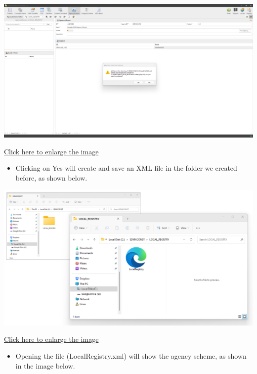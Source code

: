 \documentclass[
]{book}
\providecommand{\tightlist}{%
  \setlength{\itemsep}{0pt}\setlength{\parskip}{0pt}}
\theoremstyle{definition}
\theoremstyle{definition}
\theoremstyle{definition}
\theoremstyle{definition}
\theoremstyle{remark}
\begin{document}
\begin{center}\includegraphics[width=1\linewidth]{./images/image076} \end{center}

\href{images/image076.png}{Click here to enlarge the image}

\begin{itemize}
\tightlist
\item
  Clicking on Yes will create and save an XML file in the folder we created before, as shown below.
\end{itemize}

\begin{center}\includegraphics[width=1\linewidth]{./images/image078} \end{center}

\href{images/image078.png}{Click here to enlarge the image}

\begin{itemize}
\tightlist
\item
  Opening the file (LocalRegistry.xml) will show the agency scheme, as shown in the image below.
\end{itemize}
\end{document}
